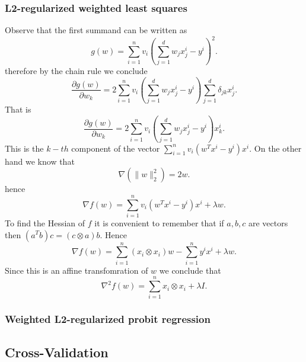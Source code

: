 \documentclass[11pt]{article}
\theoremstyle{plain}
\begin{document}
\subsubsection{L2-regularized weighted least squares}
Observe that the first summand   can be written as
\begin{equation*}
g(w)=\sum_{i=1}^{n}v_{i}(\sum_{j=1}^{d}w_{j}x_{j}^{i}-y^{i})^{2}.
\end{equation*}
therefore by the chain rule we conclude
\begin{equation*}
\frac{\partial g(w)}{\partial w_{k}}=2\sum_{i=1}^{n}v_{i}(\sum_{j=1}^{d}w_{j}x_{j}^{i}-y^{i})\sum_{j=1}^{d}\delta_{jk}x_{j}^{i}.
\end{equation*}
That is
\begin{equation*}
\frac{\partial g(w)}{\partial w_{k}}=2\sum_{i=1}^{n}v_{i}(\sum_{j=1}^{d}w_{j}x_{j}^{i}-y^{i})x_{k}^{i}.
\end{equation*}
This is the $k-th$ component of the vector $\sum_{i=1}^{n}v_{i}(w^{T}x^{i}-y^{i})x^{i}$. On the other hand we know that
\begin{equation*}
\nabla(\|w\|_{2}^{2})=2w.
\end{equation*}
hence
\begin{equation*}
\nabla f(w)=\sum_{i=1}^{n}v_{i}(w^{T}x^{i}-y^{i})x^{i}+\lambda w.
\end{equation*}
To find the Hessian of $f$ it is convenient to remember that if $a,b,c$ are vectors then $(a^{T}b)c=(c\otimes a)b$.
Hence
\begin{equation*}
\nabla f(w)=\sum_{i=1}^{n}(x_{i}\otimes x_{i})w-\sum_{i=1}^{n}y^{i}x^{i}+\lambda w.
\end{equation*}
Since this is an affine transfomration of $w$ we conclude that
\begin{equation*}
\nabla^{2}f(w)=\sum_{i=1}^{n}x_{i}\otimes x_{i}+\lambda I.
\end{equation*}

\subsubsection{Weighted L2-regularized probit regression}



\newpage
\subsection{Cross-Validation}
\end{document}
